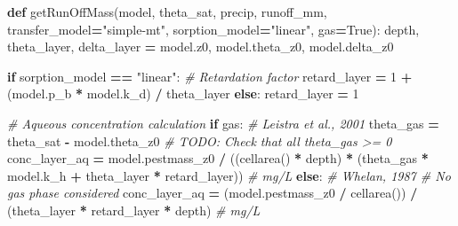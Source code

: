 \documentclass[]{article}
\newenvironment{Shaded}{\begin{snugshade}}{\end{snugshade}}
\newcommand{\KeywordTok}[1]{\textcolor[rgb]{0.13,0.29,0.53}{\textbf{{#1}}}}
\newcommand{\DecValTok}[1]{\textcolor[rgb]{0.00,0.00,0.81}{{#1}}}
\newcommand{\StringTok}[1]{\textcolor[rgb]{0.31,0.60,0.02}{{#1}}}
\newcommand{\CommentTok}[1]{\textcolor[rgb]{0.56,0.35,0.01}{\textit{{#1}}}}
\newcommand{\VariableTok}[1]{\textcolor[rgb]{0.00,0.00,0.00}{{#1}}}
\newcommand{\ControlFlowTok}[1]{\textcolor[rgb]{0.13,0.29,0.53}{\textbf{{#1}}}}
\newcommand{\OperatorTok}[1]{\textcolor[rgb]{0.81,0.36,0.00}{\textbf{{#1}}}}
\newcommand{\NormalTok}[1]{{#1}}
\begin{document}
\begin{Shaded}
\begin{Highlighting}[]


\KeywordTok{def} \NormalTok{getRunOffMass(model, theta_sat, precip, runoff_mm,}
                  \NormalTok{transfer_model}\OperatorTok{=}\StringTok{"simple-mt"}\NormalTok{, sorption_model}\OperatorTok{=}\StringTok{"linear"}\NormalTok{,}
                  \NormalTok{gas}\OperatorTok{=}\VariableTok{True}\NormalTok{):}
    \NormalTok{depth, theta_layer, delta_layer }\OperatorTok{=} \NormalTok{model.z0, model.theta_z0, model.delta_z0}

    \ControlFlowTok{if} \NormalTok{sorption_model }\OperatorTok{==} \StringTok{"linear"}\NormalTok{:}
        \CommentTok{# Retardation factor}
        \NormalTok{retard_layer }\OperatorTok{=} \DecValTok{1} \OperatorTok{+} \NormalTok{(model.p_b }\OperatorTok{*} \NormalTok{model.k_d) }\OperatorTok{/} \NormalTok{theta_layer}
    \ControlFlowTok{else}\NormalTok{:}
        \NormalTok{retard_layer }\OperatorTok{=} \DecValTok{1}

    \CommentTok{# Aqueous concentration calculation}
    \ControlFlowTok{if} \NormalTok{gas:}
        \CommentTok{# Leistra et al., 2001}
        \NormalTok{theta_gas }\OperatorTok{=} \NormalTok{theta_sat }\OperatorTok{-} \NormalTok{model.theta_z0}
        \CommentTok{# TODO: Check that all theta_gas >= 0}
        \NormalTok{conc_layer_aq }\OperatorTok{=} \NormalTok{model.pestmass_z0 }\OperatorTok{/} \NormalTok{((cellarea() }\OperatorTok{*} \NormalTok{depth) }\OperatorTok{*}
                                             \NormalTok{(theta_gas }\OperatorTok{*} \NormalTok{model.k_h }\OperatorTok{+} \NormalTok{theta_layer }\OperatorTok{*} \NormalTok{retard_layer))  }\CommentTok{# mg/L}
    \ControlFlowTok{else}\NormalTok{:}
        \CommentTok{# Whelan, 1987 # No gas phase considered}
        \NormalTok{conc_layer_aq }\OperatorTok{=} \NormalTok{(model.pestmass_z0 }\OperatorTok{/} \NormalTok{cellarea()) }\OperatorTok{/} \NormalTok{(theta_layer }\OperatorTok{*} \NormalTok{retard_layer }\OperatorTok{*} \NormalTok{depth)  }\CommentTok{# mg/L}


\end{Highlighting}
\end{Shaded}
\end{document}
